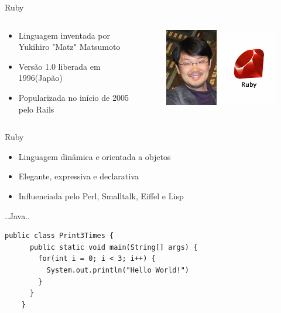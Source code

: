 \begin{frame}[fragile,t]{Ruby} 
  \begin{columns}
  \begin{column}{0.6\textwidth}
    \begin{itemize}
      \item Linguagem inventada por Yukihiro \alert{"Matz"} Matsumoto
      \item Versão \alert{1.0} liberada em \alert{1996}(Japão)
      \item \alert{Popularizada} no início de 2005 pelo \alert{Rails}
    \end{itemize}   
  \end{column}
  \begin{column}{0.4\textwidth}
    \begin{figure}[hbt]
      \includegraphics[scale=.5]{imagens/matz.jpg}
    \end{figure}
    \end{column}
\end{columns}
\end{frame}
\begin{frame}[fragile,t]{Ruby}
  \begin{itemize}
    \item Linguagem \alert{dinâmica} e \alert{orientada a objetos}
    \item Elegante, \alert{expressiva} e declarativa
    \item Influenciada pelo Perl, Smalltalk, Eiffel e Lisp
  \end{itemize}   
\end{frame}
\begin{frame}[fragile,t]{..Java..}
  \begin{lstlisting}[style=JavaInputStyle]
    public class Print3Times {
      public static void main(String[] args) {
        for(int i = 0; i < 3; i++) {
          System.out.println("Hello World!")
        }
      }
    }
  \end{lstlisting}
\end{frame}
